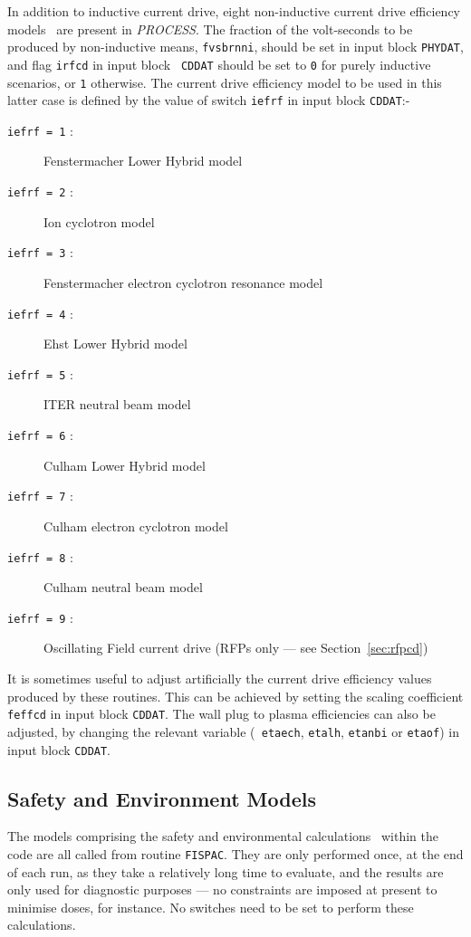 \documentclass[11pt,a4paper]{report}
\makeatletter
\newcommand{\PSD}{\mbox{\it PROCESS}\@.\/ }
\makeatother
\begin{document}
In addition to inductive current drive, eight non-inductive current drive
efficiency models~\cite{172} are present in \PSD The fraction of the
volt-seconds to be produced by non-inductive means, {\tt fvsbrnni}, should be
set in input block {\tt PHYDAT}, and flag {\tt irfcd} in input block {\tt
CDDAT} should be set to {\tt 0} for purely inductive scenarios, or {\tt 1}
otherwise. The current drive efficiency model to be used in this latter case
is defined by the value of switch {\tt iefrf} in input block {\tt CDDAT}:-

\begin{description}
\item [{\tt iefrf = 1} :] Fenstermacher Lower Hybrid model
\item [{\tt iefrf = 2} :] Ion cyclotron model~\cite{IPDG}
\item [{\tt iefrf = 3} :] Fenstermacher electron cyclotron resonance model
\item [{\tt iefrf = 4} :] Ehst Lower Hybrid model
\item [{\tt iefrf = 5} :] ITER neutral beam model~\cite{IPDG,172}
\item [{\tt iefrf = 6} :] Culham Lower Hybrid model~\cite{172}
\item [{\tt iefrf = 7} :] Culham electron cyclotron model~\cite{172}
\item [{\tt iefrf = 8} :] Culham neutral beam model~\cite{172}
\item [{\tt iefrf = 9} :] Oscillating Field current drive (RFPs only --- see
Section~\ref{sec:rfpcd})
\end{description}

It is sometimes useful to adjust artificially the current drive efficiency
values produced by these routines. This can be achieved by setting the scaling
coefficient {\tt feffcd} in input block {\tt CDDAT}. The wall plug to plasma
efficiencies can also be adjusted, by changing the relevant variable ({\tt
etaech}, {\tt etalh}, {\tt etanbi} or {\tt etaof}) in input block {\tt CDDAT}.

\subsection{Safety and Environment Models}

The models comprising the safety and environmental calculations~\cite{FISPACT}
within the code are all called from routine {\tt FISPAC}. They are only
performed once, at the end of each run, as they take a relatively long time to
evaluate, and the results are only used for diagnostic purposes --- no
constraints are imposed at present to minimise doses, for instance. No
switches need to be set to perform these calculations.
\end{document}
